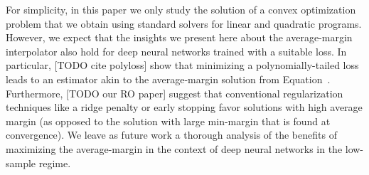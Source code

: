 For simplicity, in this paper we only study the solution of a convex
optimization problem that we obtain using standard solvers for linear and
quadratic programs. However, we expect that the insights we present here about
the average-margin interpolator also hold for deep neural networks trained with
a suitable loss. In particular, [TODO cite polyloss] show that minimizing a
polynomially-tailed loss leads to an estimator akin to the average-margin
solution from Equation~. Furthermore, [TODO our RO paper] suggest
that conventional regularization techniques like a ridge penalty or early
stopping favor solutions with high average margin (as opposed to the solution
with large min-margin that is found at convergence).  We leave as future work a
thorough analysis of the benefits of maximizing the average-margin in the
context of deep neural networks in the low-sample regime.

